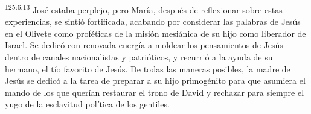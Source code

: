 \par 
\textsuperscript{125:6.13} José estaba perplejo, pero María, después de reflexionar sobre estas experiencias, se sintió fortificada, acabando por considerar las palabras de Jesús en el Olivete como proféticas de la misión mesiánica de su hijo como liberador de Israel. Se dedicó con renovada energía a moldear los pensamientos de Jesús dentro de canales nacionalistas y patrióticos, y recurrió a la ayuda de su hermano, el tío favorito de Jesús. De todas las maneras posibles, la madre de Jesús se dedicó a la tarea de preparar a su hijo primogénito para que asumiera el mando de los que querían restaurar el trono de David y rechazar para siempre el yugo de la esclavitud política de los gentiles.